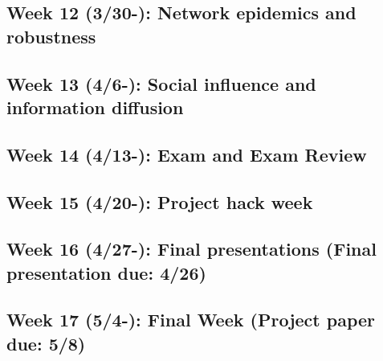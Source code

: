 \documentclass[11pt,article,oneside]{memoir} %
\begin{document}
\subsection{Week 12 (3/30-): Network epidemics and robustness}
\subsection{Week 13 (4/6-): Social influence and information diffusion}
\subsection{Week 14 (4/13-): Exam and Exam Review}
\subsection{Week 15 (4/20-): Project hack week}
\subsection{Week 16 (4/27-): Final presentations (Final presentation due: 4/26)}
\subsection{Week 17 (5/4-): Final Week (Project paper due: 5/8)}

\end{document}
